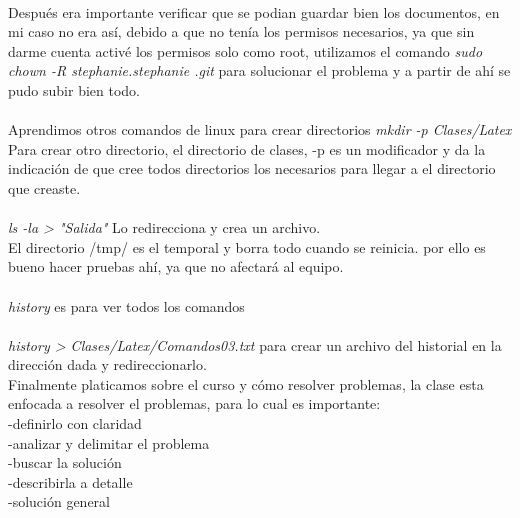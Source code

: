 \documentclass{book}
\begin{document}
	\\
	Después era importante verificar que se podian guardar bien los documentos, en mi caso no era así, debido a que no tenía los permisos necesarios, ya que sin darme cuenta activé los permisos solo como root, utilizamos el comando \textit{sudo chown -R stephanie.stephanie .git} para solucionar el problema y a partir de ahí se pudo subir bien todo.\\
	\\
	Aprendimos otros comandos de linux para crear directorios 
	\textit{mkdir -p Clases/Latex} Para crear otro directorio, el directorio de clases, -p es un modificador y da la indicación de que cree todos directorios los necesarios para llegar a el directorio que creaste.\\
	\\
	
	\textit{ls -la > "Salida"} Lo redirecciona y crea un archivo.\\
	El directorio /tmp/ es el temporal y borra todo cuando se reinicia. por ello es bueno hacer pruebas ahí, ya que no afectará al equipo.\\
	\\
	\textit{	history} es para ver todos los comandos\\
	\\
	\textit{history > Clases/Latex/Comandos03.txt} para crear un archivo del historial en la dirección dada y redireccionarlo.\\
	
	
	Finalmente platicamos sobre el curso y cómo resolver problemas, la clase esta enfocada a resolver el problemas, para lo cual es importante:\\
	-definirlo con claridad\\
	-analizar y delimitar el problema\\
	-buscar la solución \\
	-describirla a detalle\\
	-solución general\\
	
\end{document}
